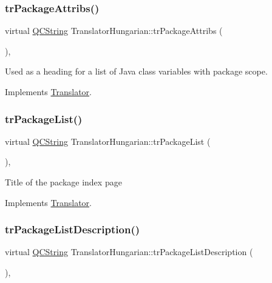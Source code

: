 \subsubsection{\texorpdfstring{trPackageAttribs()}{trPackageAttribs()}}
{\footnotesize\ttfamily virtual \mbox{\hyperlink{class_q_c_string}{Q\+C\+String}} Translator\+Hungarian\+::tr\+Package\+Attribs (\begin{DoxyParamCaption}{ }\end{DoxyParamCaption})\hspace{0.3cm}{\ttfamily [inline]}, {\ttfamily [virtual]}}

Used as a heading for a list of Java class variables with package scope. 

Implements \mbox{\hyperlink{class_translator}{Translator}}.

\mbox{\label{class_translator_hungarian_a3bc593b7e7939e7707bd9d992e2199c6}} 
\subsubsection{\texorpdfstring{trPackageList()}{trPackageList()}}
{\footnotesize\ttfamily virtual \mbox{\hyperlink{class_q_c_string}{Q\+C\+String}} Translator\+Hungarian\+::tr\+Package\+List (\begin{DoxyParamCaption}{ }\end{DoxyParamCaption})\hspace{0.3cm}{\ttfamily [inline]}, {\ttfamily [virtual]}}

Title of the package index page 

Implements \mbox{\hyperlink{class_translator}{Translator}}.

\mbox{\label{class_translator_hungarian_a7758cc8c0fbd6e509b2d1a1084477cc1}} 
\subsubsection{\texorpdfstring{trPackageListDescription()}{trPackageListDescription()}}
{\footnotesize\ttfamily virtual \mbox{\hyperlink{class_q_c_string}{Q\+C\+String}} Translator\+Hungarian\+::tr\+Package\+List\+Description (\begin{DoxyParamCaption}{ }\end{DoxyParamCaption})\hspace{0.3cm}{\ttfamily [inline]}, {\ttfamily [virtual]}}

